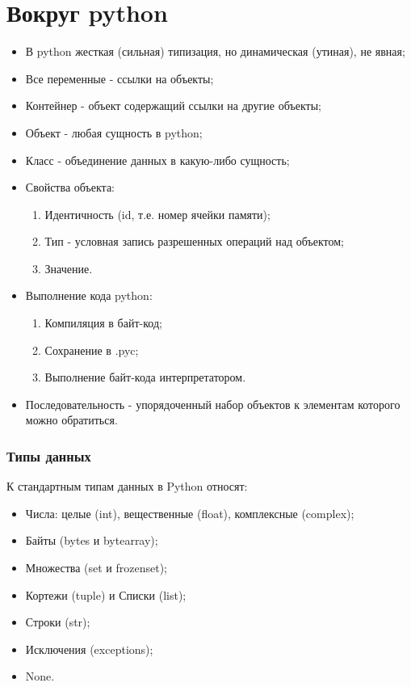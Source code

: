 \part{Вокруг python}

\begin{itemize}
    \item В python жесткая (сильная) типизация, но динамическая (утиная), не явная;
    \item Все переменные - ссылки на объекты;
    \item Контейнер - объект содержащий ссылки на другие объекты;
    \item Объект - любая сущность в python;
    \item Класс - объединение данных в какую-либо сущность;
    \item Свойства объекта:
\begin{enumerate}
\item Идентичность (id, т.е. номер ячейки памяти);
\item Тип - условная запись разрешенных операций над объектом;
\item Значение.
\end{enumerate}
    \item Выполнение кода python:
		\begin{enumerate}
			\item Компиляция в байт-код;
			\item Сохранение в .pyc;
			\item Выполнение байт-кода интерпретатором.
		\end{enumerate}
    \item Последовательность - упорядоченный набор объектов к элементам которого можно обратиться.
\end{itemize}

\section{Типы данных}

	К стандартным типам данных в Python относят:
	\begin{itemize}
		\item Числа: целые (int), вещественные (float), комплексные (complex);
		\item Байты (bytes и bytearray);
		\item Множества (set и frozenset);
		\item Кортежи (tuple) и Списки (list);
		\item Строки (str);
		\item Исключения (exceptions);
		\item None.
	\end{itemize}

